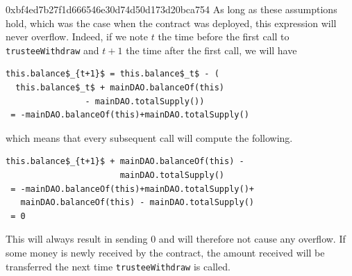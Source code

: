 \begin{investigation}{0xbf4ed7b27f1d666546e30d74d50d173d20bca754}
  As long as these assumptions hold, which was the case when the contract was deployed, this expression will never overflow. Indeed, if we note $t$ the time before the first call to \lstinline{trusteeWithdraw} and $t + 1$ the time after the first call, we will have
  \begin{lstlisting}
this.balance$_{t+1}$ = this.balance$_t$ - (
  this.balance$_t$ + mainDAO.balanceOf(this)
                - mainDAO.totalSupply())
 = -mainDAO.balanceOf(this)+mainDAO.totalSupply()
\end{lstlisting}


  which means that every subsequent call will compute the following.

  \begin{lstlisting}
this.balance$_{t+1}$ + mainDAO.balanceOf(this) -
                       mainDAO.totalSupply()
 = -mainDAO.balanceOf(this)+mainDAO.totalSupply()+
   mainDAO.balanceOf(this) - mainDAO.totalSupply()
 = 0
\end{lstlisting}


  This will always result in sending $0$ and will therefore not cause any overflow. If some money is newly received by the contract, the amount received will be transferred the next time \lstinline{trusteeWithdraw} is called.
\end{investigation}



